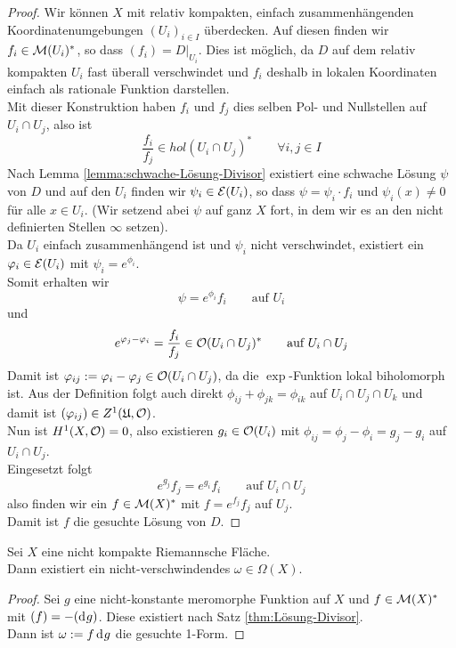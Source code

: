 \begin{proof}
  Wir können $X$ mit relativ kompakten, einfach zusammenhängenden
  Koordinatenumgebungen $(U_i)_{i \in I}$ überdecken. Auf diesen
  finden wir $f_i \in \mathcal{M}(U_i)^\ast$, so dass $(f_i) =
  D|_{U_i}$. Dies ist möglich, da $D$ auf dem relativ kompakten $U_i$
  fast überall verschwindet und $f_i$ deshalb in lokalen Koordinaten
  einfach als rationale Funktion darstellen.\\
  Mit dieser Konstruktion haben $f_i$ und $f_j$ dies selben Pol- und
  Nullstellen auf $U_i \cap U_j$, also ist
  \[
  \frac{f_i}{f_j} \in hol(U_i \cap U_j)^\ast \qquad \forall i,j \in I
  \]
  Nach Lemma \ref{lemma:schwache-Lösung-Divisor} existiert eine
  schwache Lösung $\psi$ von $D$ und auf den $U_i$ finden wir $\psi_i
  \in \mathcal{E}(U_i)$, so dass $\psi = \psi_i \cdot f_i$ und $\psi_i(x)
  \neq 0$ für alle $x \in U_i$. (Wir setzend abei $\psi$ auf ganz $X$
  fort, in dem wir es an den nicht definierten Stellen $\infty$
  setzen). \\
  Da $U_i$ einfach zusammenhängend ist und $\psi_i$ nicht
  verschwindet, existiert ein $\varphi_i \in \mathcal{E}(U_i)$ mit $\psi_i =
  e^{\phi_i}$. \\
  Somit erhalten wir
  \[
  \psi = e^{\phi_i} f_i \qquad \text{auf } U_i
  \]
  und
  \[
  e^{\varphi_j - \varphi_i} = \frac{f_i}{f_j} \in \mathcal{O}(U_i \cap U_j)^\ast
  \qquad \text{auf } U_i \cap U_j
  \]
  Damit ist $\varphi_{ij} := \varphi_i - \varphi_j \in \mathcal{O}(U_i \cap U_j)$, da
  die $\exp$-Funktion lokal biholomorph ist. Aus der Definition folgt
  auch direkt $\phi_{ij} + \phi_{jk} = \phi_{ik}$ auf $U_i \cap U_j
  \cap U_k$ und damit ist $(\varphi_{ij}) \in Z^1(\mathfrak{U}, \mathcal{O})$. \\
  Nun ist $H^1(X, \mathcal{O}) = 0$, also existieren $g_i \in \mathcal{O}(U_i)$ mit
  $\phi_{ij} = \phi_j - \phi_i = g_j - g_i$ auf $U_i \cap U_j$. \\
  Eingesetzt folgt
  \[
  e^{g_j} f_j = e^{g_i} f_i \qquad \text{auf } U_i \cap U_j
  \]
  also finden wir ein $f \in \mathcal{M}(X)^\ast$ mit $f = e^{f_j} f_j$ auf
  $U_j$. \\
  Damit ist $f$ die gesuchte Lösung von $D$.
\end{proof}

\begin{cor}
  \label{cor:nicht-verschwindende-1-form}
  Sei $X$ eine nicht kompakte Riemannsche Fläche. \\
  Dann existiert ein nicht-verschwindendes $\omega \in \Omega(X)$.
\end{cor}

\begin{proof}
  Sei $g$ eine nicht-konstante meromorphe Funktion auf $X$ und $f \in
  \mathcal{M}(X)^\ast$ mit $(f) = -(\d[g])$. Diese existiert nach Satz
  \ref{thm:Lösung-Divisor}.\\
  Dann ist $\omega := f \d[g]$ die gesuchte 1-Form.
\end{proof}


